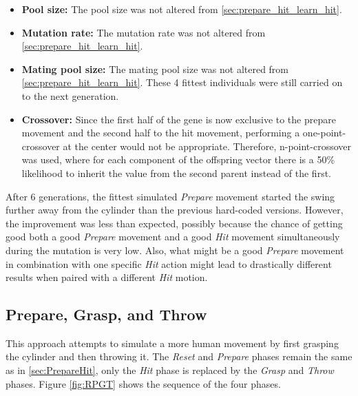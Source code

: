 \begin{itemize}
\item \textbf{Pool size:} The pool size was not altered from \ref{sec:prepare_hit_learn_hit}.
\item \textbf{Mutation rate:} The mutation rate was not altered from \ref{sec:prepare_hit_learn_hit}.
\item \textbf{Mating pool size:} The mating pool size was not altered from \ref{sec:prepare_hit_learn_hit}. These 4 fittest individuals were still carried on to the next generation.
\item \textbf{Crossover:} Since the first half of the gene is now exclusive to the prepare movement and the second half to the hit movement, performing a one-point-crossover at the center would not be appropriate. Therefore, n-point-crossover was used, where for each component of the offspring vector there is a 50\% likelihood to inherit the value from the second parent instead of the first.
\end{itemize}

After 6 generations, the fittest simulated \textit{Prepare} movement started the swing further away from the cylinder than the previous hard-coded versions. However, the improvement was less than expected, possibly because the chance of getting good both a good \textit{Prepare} movement and a good \textit{Hit} movement simultaneously during the mutation is very low. Also, what might be a good \textit{Prepare} movement in combination with one specific \textit{Hit} action might lead to drastically different results when paired with a different \textit{Hit} motion.


\subsection{Prepare, Grasp, and Throw} \label{sec:Throw}

This approach attempts to simulate a more human movement by first grasping the cylinder and then throwing it.
The \textit{Reset} and \textit{Prepare} phases remain the same as in \ref{sec:PrepareHit}, only the \textit{Hit} phase is replaced by the \textit{Grasp} and \textit{Throw} phases.
Figure \ref{fig:RPGT} shows the sequence of the four phases.


